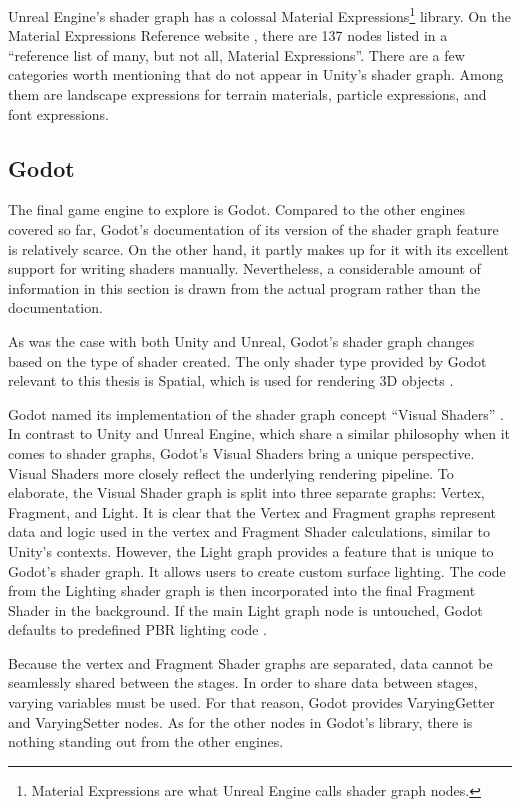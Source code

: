 \documentclass[
  digital,     %
  oneside,     %
  nosansbold,  %
  nocolorbold, %
  lof,         %
  lot,         %
]{fithesis4}
\begin{document}
Unreal Engine's shader graph has a colossal Material Expressions\footnote{Material Expressions are what Unreal Engine
calls shader graph nodes.} library. On the Material Expressions Reference website
\cite{ue-expr-reference}, there are 137 nodes listed in a \enquote{reference list of many, but not all, Material Expressions}.
There are a few categories worth mentioning that do not appear in Unity's shader graph. Among them are landscape expressions
for terrain materials, particle expressions, and font expressions.

\subsection{Godot}\label{sec:godot}
The final game engine to explore is Godot. Compared to the other engines covered so far, Godot's documentation
of its version of the shader graph feature is relatively scarce. On the other hand, it partly makes up for it
with its excellent support for writing shaders manually. Nevertheless, a considerable amount of information in this section
is drawn from the actual program rather than the documentation.

As was the case with both Unity and Unreal, Godot's shader graph changes based on the type of shader created.
The only shader type provided by Godot relevant to this thesis is Spatial, which is used for rendering 3D objects
\cite{godot-spatial-shaders}.

Godot named its implementation of the shader graph concept \enquote{Visual Shaders} \cite{godot-visual-shaders}.
In contrast to Unity and Unreal Engine, which share a similar philosophy when it comes to shader graphs,
Godot's Visual Shaders bring a unique perspective. Visual Shaders more closely reflect the underlying
rendering pipeline. To elaborate, the Visual Shader graph is split into three separate graphs:
Vertex, Fragment, and Light. It is clear that the Vertex and Fragment graphs represent data and logic used in the vertex
and Fragment Shader calculations, similar to Unity's contexts.
However, the Light graph provides a feature that is unique to Godot's shader graph.
It allows users to create custom surface lighting. The code from the Lighting shader graph is then incorporated
into the final Fragment Shader in the background. If the main Light graph node is untouched,
Godot defaults to predefined PBR lighting code \cite{godot-shaders-intro}.

Because the vertex and Fragment Shader graphs are separated, data cannot be seamlessly shared between the stages.
In order to share data between stages, varying variables must be used. For that reason, Godot provides
VaryingGetter and VaryingSetter nodes. As for the other nodes in Godot's library, there is nothing standing
out from the other engines.
\end{document}
